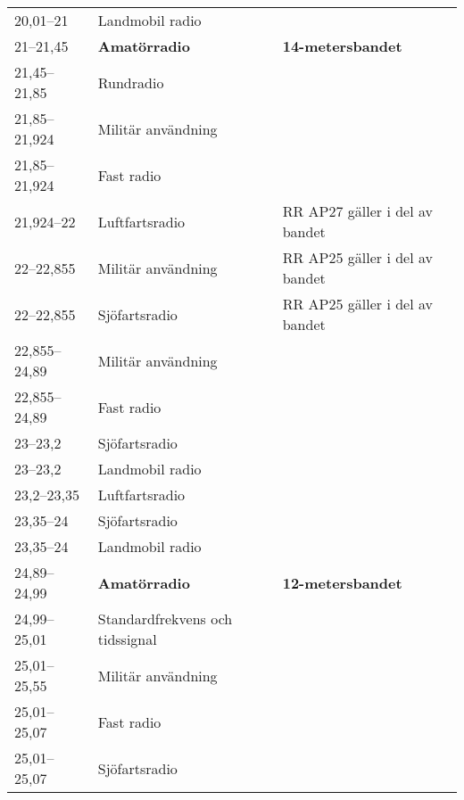 \begin{landscape}
\begin{longtable}{lll}
20,01--21         & Landmobil radio                  &                                 \\
21--21,45         & \textbf{Amatörradio}             & \textbf{14-metersbandet}        \\
21,45--21,85      & Rundradio                        &                                 \\
21,85--21,924     & Militär användning               &                                 \\
21,85--21,924     & Fast radio                       &                                 \\
21,924--22        & Luftfartsradio                   & RR AP27 gäller i del av bandet  \\
22--22,855        & Militär användning               & RR AP25 gäller i del av bandet  \\
22--22,855        & Sjöfartsradio                    & RR AP25 gäller i del av bandet  \\
22,855--24,89     & Militär användning               &                                 \\
22,855--24,89     & Fast radio                       &                                 \\
23--23,2          & Sjöfartsradio                    &                                 \\
23--23,2          & Landmobil radio                  &                                 \\
23,2--23,35       & Luftfartsradio                   &                                 \\
23,35--24         & Sjöfartsradio                    &                                 \\
23,35--24         & Landmobil radio                  &                                 \\
24,89--24,99      & \textbf{Amatörradio}             & \textbf{12-metersbandet}        \\
24,99--25,01      & Standardfrekvens och tidssignal  &                                 \\
25,01--25,55      & Militär användning               &                                 \\
25,01--25,07      & Fast radio                       &                                 \\
25,01--25,07      & Sjöfartsradio                    &                                 \\

\end{longtable}
\end{landscape}
